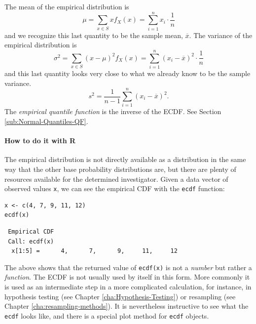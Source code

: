 \documentclass[captions=tableheading]{scrbook}
\begin{document}
The mean of the empirical distribution is
\begin{equation}
\mu=\sum_{x\in S}xf_{X}(x)=\sum_{i=1}^{n}x_{i}\cdot\frac{1}{n}
\end{equation}
and we recognize this last quantity to be the sample mean, \(\overline{x}\). The variance of the empirical distribution is
\begin{equation}
\sigma^{2}=\sum_{x\in S}(x-\mu)^{2}f_{X}(x)=\sum_{i=1}^{n}(x_{i}-\overline{x})^{2}\cdot\frac{1}{n}
\end{equation}
and this last quantity looks very close to what we already know to be the sample variance.
\begin{equation}
s^{2}=\frac{1}{n-1}\sum_{i=1}^{n}(x_{i}-\overline{x})^{2}.
\end{equation}
The \emph{empirical quantile function} is the inverse of the ECDF. See Section \ref{sub:Normal-Quantiles-QF}.


\paragraph*{How to do it with \textsf{R}}

The empirical distribution is not directly available as a distribution in the same way that the other base probability distributions are, but there are plenty of resources available for the determined investigator.  Given a data vector of observed values \texttt{x}, we can see the empirical CDF with the \texttt{ecdf} function:


\begin{verbatim}
x <- c(4, 7, 9, 11, 12)
ecdf(x)
\end{verbatim}

\begin{verbatim}
 Empirical CDF 
 Call: ecdf(x)
  x[1:5] =      4,      7,      9,     11,     12
\end{verbatim}

The above shows that the returned value of \texttt{ecdf(x)} is not a \emph{number} but rather a \emph{function}. The ECDF is not usually used by itself in this form. More commonly it is used as an intermediate step in a more complicated calculation, for instance, in hypothesis testing (see Chapter \ref{cha:Hypothesis-Testing}) or resampling (see Chapter \ref{cha:resampling-methods}). It is nevertheless instructive to see what the \texttt{ecdf} looks like, and there is a special plot method for \texttt{ecdf} objects.
\end{document}

